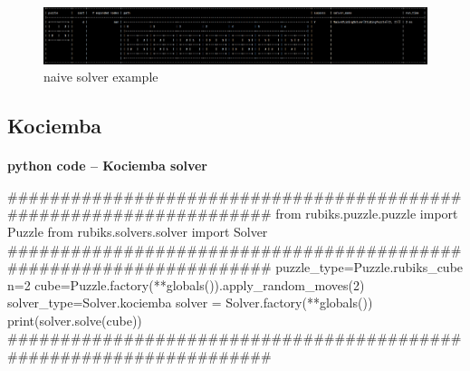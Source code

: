 \begin{figure}[H]
\centering
\includegraphics[scale=0.39]{./Figures/examplenaivesolver}
\caption[Examples]{naive solver example}
\label{fig:examplenaivesolver}
\end{figure}



\subsection{Kociemba}


\afblue
\paragraph{}{\textbf{python code -- Kociemba solver}}
\begin{python}
####################################################################
from rubiks.puzzle.puzzle import Puzzle
from rubiks.solvers.solver import Solver
####################################################################
puzzle_type=Puzzle.rubiks_cube
n=2
cube=Puzzle.factory(**globals()).apply_random_moves(2)
solver_type=Solver.kociemba
solver = Solver.factory(**globals())
print(solver.solve(cube))
####################################################################

\end{python}
\black

